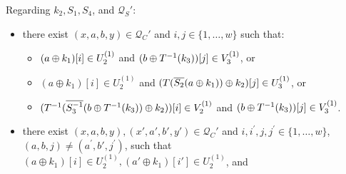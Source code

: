 \begin{definition}
\begin{itemize}[leftmargin=10mm]
\begin{itemize}
		\end{itemize}
	\end{itemize}
	Regarding $k_2,S_1,S_4$, and $\mathcal{Q}_S'$:
	\begin{itemize}[leftmargin=10mm]
		\item[\bfour] there exist $(x,a,b,y) \in \mathcal{Q}_{C}'$ and $i, j\in\{1, \ldots, w\}$ such that:
		\begin{itemize}
			\item $(a\oplus k_1)[i]\in U_2^{(1)}$ and $(b\oplus T^{-1}(k_3))[j]\in V_3^{(1)}$, or
			\item $(a \oplus k_1)[i]\in U_{2}^{(1)}$ and $(T(\overline{S_2}(a \oplus k_1))\oplus k_2)[j]\in U_{3}^{(1)}$, or
			\item $(T^{-1}(\overline{S_3^{-1}}(b\oplus T^{-1}(k_3))\oplus k_2))[i]\in V_2^{(1)}$ and $(b\oplus T^{-1}(k_3))[j]\in V_{3}^{(1)}$.
		\end{itemize}
		\item[\bfive] there exist $(x,a,b,y),(x',a',b',y') \in \mathcal{Q}_{C}'$ and $i, i^{\prime},j, j^{\prime} \in\{1, \ldots, w\}$, $(a,b, j) \neq \left(a^{\prime}, b',j^{\prime}\right)$, such that $(a \oplus k_1)[i]\in U_{2}^{(1)}, (a' \oplus k_1)[i']\in U_{2}^{(1)}$, and

\end{itemize}
\end{definition}
